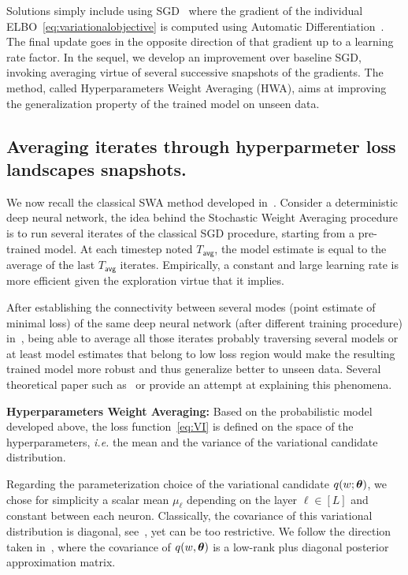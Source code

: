\documentclass{article} %
\begin{document}
Solutions simply include using SGD~\citep{bottou2008tradeoffs} where the gradient of the individual ELBO~\eqref{eq:variationalobjective} is computed using Automatic Differentiation~\citep{kucukelbir2017automatic}. The final update goes in the opposite direction of that gradient up to a learning rate factor.
In the sequel, we develop an improvement over baseline SGD, invoking averaging virtue of several successive snapshots of the gradients.
The method, called Hyperparameters Weight Averaging (HWA), aims at improving the generalization property of the trained model on unseen data.


\subsection{Averaging iterates through hyperparmeter loss landscapes snapshots.}

We now recall the classical SWA method developed in~\citep{izmailov2018averaging}. 
Consider a deterministic deep neural network, the idea behind the Stochastic Weight Averaging procedure is to run several iterates of the classical SGD procedure, starting from a pre-trained model.
At each timestep noted $T_{\mathsf{avg}}$, the model estimate is equal to the average of the last $T_{\mathsf{avg}}$ iterates.
Empirically, a constant and large learning rate is more efficient given the exploration virtue that it implies.

After establishing the connectivity between several modes (point estimate of minimal loss) of the same deep neural network (after different training procedure) in~\citep{garipov2018loss}, being able to average all those iterates probably traversing several models or at least model estimates that belong to low loss region would make the resulting trained model more robust and thus generalize better to unseen data.
Several theoretical paper such as~\citep{he2019asymmetric} or \citep{keskar2016large} provide an attempt at explaining this phenomena.


\textbf{Hyperparameters Weight Averaging:}
Based on the probabilistic model developed above, the loss function~\eqref{eq:VI} is defined on the space of the hyperparameters, \textit{i.e.} the mean and the variance of the variational candidate distribution.

Regarding the parameterization choice of the variational candidate $q( w; \param )$, we chose for simplicity a scalar mean $\mu_{\ell}$ depending on the layer $\ell \in [L]$ and constant between each neuron. Classically, the covariance of this variational distribution is diagonal, see~\citep{kirkpatrick2017overcoming, blundell2015weight}, yet can be too restrictive.
We follow the direction taken in~\citep{maddox2019simple}, where the covariance of $q(w, \param)$ is a low-rank plus diagonal posterior approximation matrix.
\end{document}
